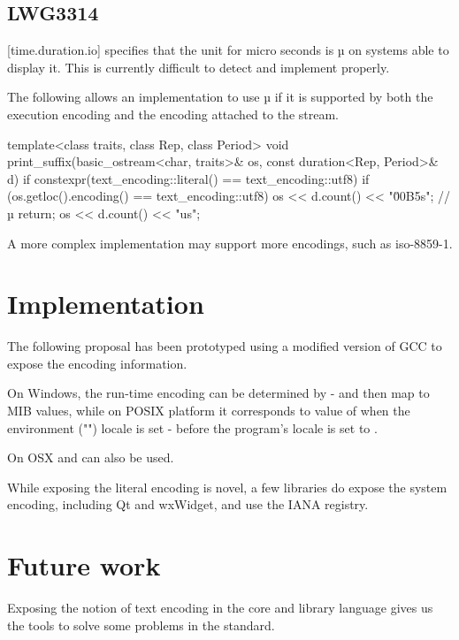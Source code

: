 \documentclass{wg21}
\begin{document}
\subsection{LWG3314}

[time.duration.io] specifies that the unit for micro seconds is µ on systems able to display it.
This is currently difficult to detect and implement properly.

The following allows an implementation to use µ if it is supported by both the execution encoding and the encoding
attached to the stream.


\begin{codeblock}
template<class traits, class Rep, class Period>
void print_suffix(basic_ostream<char, traits>& os, const duration<Rep, Period>& d)
{
	if constexpr(text_encoding::literal() == text_encoding::utf8) {
		if (os.getloc().encoding() == text_encoding::utf8) {
			os << d.count() << "\u00B5s"; // µ
			return;
		}
	}
	os << d.count() << "us";
}
\end{codeblock}

A more complex implementation may support more encodings, such as iso-8859-1.

\section{Implementation}

The following proposal has been prototyped using a modified version of GCC to expose the encoding information.

On Windows, the run-time encoding can be determined by  - and then map to MIB values, while on POSIX platform it corresponds to value of  when the environment ("") locale is set - before the program's locale is set to .

On OSX  and  can also be used.


While exposing the literal encoding is novel, a few libraries do expose the system encoding, including Qt and wxWidget, and use the IANA registry.

\section{Future work}

Exposing the notion of text encoding in the core and library language gives us the tools to solve some
problems in the standard.
\end{document}
